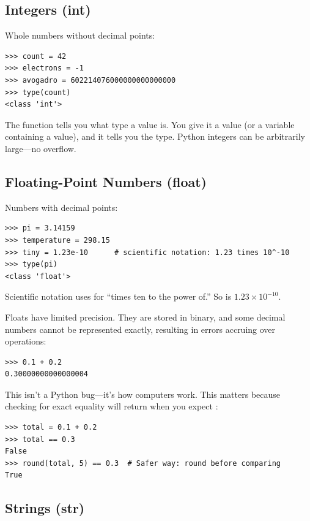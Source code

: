 \subsection{Integers (int)}

Whole numbers without decimal points:

\begin{lstlisting}
>>> count = 42
>>> electrons = -1
>>> avogadro = 602214076000000000000000
>>> type(count)
<class 'int'>
\end{lstlisting}

The  function tells you what type a value is. You give it a value (or a variable containing a value), and it tells you the type. Python integers can be arbitrarily large---no overflow.

\subsection{Floating-Point Numbers (float)}
\label{subsec:floats}

Numbers with decimal points:

\begin{lstlisting}
>>> pi = 3.14159
>>> temperature = 298.15
>>> tiny = 1.23e-10      # scientific notation: 1.23 times 10^-10
>>> type(pi)
<class 'float'>
\end{lstlisting}

Scientific notation uses  for ``times ten to the power of.'' So  is $1.23 \times 10^{-10}$.

\begin{warning}
Floats have limited precision. They are stored in binary, and some decimal numbers cannot be represented exactly, resulting in errors accruing over operations:
\begin{lstlisting}
>>> 0.1 + 0.2
0.30000000000000004
\end{lstlisting}
This isn't a Python bug---it's how computers work. This matters because checking for exact equality will return  when you expect :
\begin{lstlisting}
>>> total = 0.1 + 0.2
>>> total == 0.3
False
>>> round(total, 5) == 0.3	# Safer way: round before comparing
True
\end{lstlisting}
\end{warning}


\subsection{Strings (str)}

